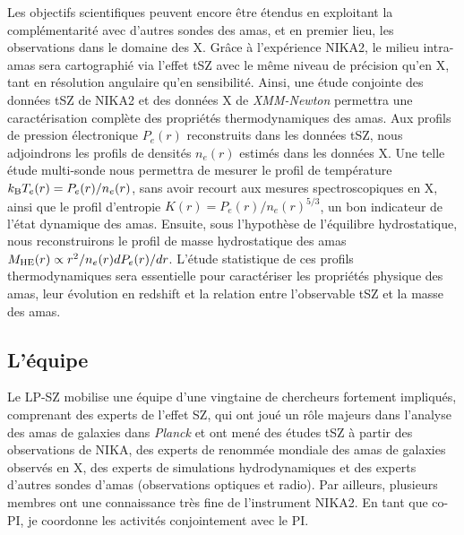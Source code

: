 Les objectifs scientifiques peuvent encore être étendus en exploitant
la complémentarité avec d'autres sondes des amas, et en premier lieu,
les observations dans le domaine des X. Grâce à l'expérience NIKA2, le
milieu intra-amas sera cartographié via l'effet tSZ avec le même
niveau de précision qu'en X, tant en résolution angulaire qu'en
sensibilité. Ainsi, une étude conjointe des données tSZ de NIKA2 et
des données X de \emph{XMM-Newton} permettra une caractérisation
complète des propriétés thermodynamiques des amas. Aux profils de
pression électronique $P_e(r)$ reconstruits dans les données tSZ, nous
adjoindrons les profils de densités $n_e(r)$ estimés dans les données
X. Une telle étude multi-sonde nous permettra de mesurer le profil de
température $k_{\rm{B}} T_e(r) = P_e(r)/n_e(r)$, sans avoir recourt
aux mesures spectroscopiques en X, ainsi que le profil
d'entropie $K(r) = P_e(r)/n_e(r)^{5/3}$, un bon indicateur de l'état
dynamique des amas. Ensuite, sous l'hypothèse de l'équilibre
hydrostatique, nous reconstruirons le profil de masse hydrostatique
des amas $M_{\rm{HE}} (r) \propto r^2/n_e(r) dP_e(r)/dr$.  
L'étude statistique de ces profils thermodynamiques sera essentielle
pour caractériser les propriétés physique des amas, leur évolution en
redshift et la relation entre l'observable tSZ et la masse des amas.  


\subsection{L'équipe}
Le LP-SZ mobilise une équipe d'une vingtaine de chercheurs fortement
impliqués, comprenant des experts de l'effet SZ, qui ont joué un rôle
majeurs dans l'analyse des amas de galaxies dans \emph{Planck} et ont
mené des études tSZ à partir des observations de NIKA, des experts de
renommée mondiale des amas de galaxies observés en X, des experts de
simulations hydrodynamiques et des experts d'autres sondes d'amas
(observations optiques et radio). Par ailleurs, plusieurs membres ont
une connaissance très fine de l'instrument NIKA2. En tant que co-PI,
je coordonne les activités conjointement avec le PI.



%
%
%
%
%
%
%
%
